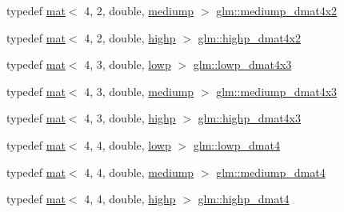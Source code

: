 \begin{DoxyCompactItemize}
typedef \mbox{\hyperlink{structglm_1_1mat}{mat}}$<$ 4, 2, double, \mbox{\hyperlink{namespaceglm_a36ed105b07c7746804d7fdc7cc90ff25a6416f3ea0c9025fb21ed50c4d6620482}{mediump}} $>$ \mbox{\hyperlink{group__core__precision_ga0ef199d025bd14f9fc8f3ebd2b8daaa5}{glm\+::mediump\+\_\+dmat4x2}}
\item 
typedef \mbox{\hyperlink{structglm_1_1mat}{mat}}$<$ 4, 2, double, \mbox{\hyperlink{namespaceglm_a36ed105b07c7746804d7fdc7cc90ff25ac6f7eab42eacbb10d59a58e95e362074}{highp}} $>$ \mbox{\hyperlink{group__core__precision_ga22c6b4fe5bb2e33a3cfa1c026803dd68}{glm\+::highp\+\_\+dmat4x2}}
\item 
typedef \mbox{\hyperlink{structglm_1_1mat}{mat}}$<$ 4, 3, double, \mbox{\hyperlink{namespaceglm_a36ed105b07c7746804d7fdc7cc90ff25ae161af3fc695e696ce3bf69f7332bc2d}{lowp}} $>$ \mbox{\hyperlink{group__core__precision_gaf829f4341a7592475df926eb9b416dd4}{glm\+::lowp\+\_\+dmat4x3}}
\item 
typedef \mbox{\hyperlink{structglm_1_1mat}{mat}}$<$ 4, 3, double, \mbox{\hyperlink{namespaceglm_a36ed105b07c7746804d7fdc7cc90ff25a6416f3ea0c9025fb21ed50c4d6620482}{mediump}} $>$ \mbox{\hyperlink{group__core__precision_ga3c31b359e06498f36aae9bfde929a8ce}{glm\+::mediump\+\_\+dmat4x3}}
\item 
typedef \mbox{\hyperlink{structglm_1_1mat}{mat}}$<$ 4, 3, double, \mbox{\hyperlink{namespaceglm_a36ed105b07c7746804d7fdc7cc90ff25ac6f7eab42eacbb10d59a58e95e362074}{highp}} $>$ \mbox{\hyperlink{group__core__precision_ga9a5dab260df6e8c46c747bac0b8d2f38}{glm\+::highp\+\_\+dmat4x3}}
\item 
typedef \mbox{\hyperlink{structglm_1_1mat}{mat}}$<$ 4, 4, double, \mbox{\hyperlink{namespaceglm_a36ed105b07c7746804d7fdc7cc90ff25ae161af3fc695e696ce3bf69f7332bc2d}{lowp}} $>$ \mbox{\hyperlink{group__core__precision_ga608895f4a515c7ac6cf3a1c2f11e13cc}{glm\+::lowp\+\_\+dmat4}}
\item 
typedef \mbox{\hyperlink{structglm_1_1mat}{mat}}$<$ 4, 4, double, \mbox{\hyperlink{namespaceglm_a36ed105b07c7746804d7fdc7cc90ff25a6416f3ea0c9025fb21ed50c4d6620482}{mediump}} $>$ \mbox{\hyperlink{group__core__precision_ga4b027f0f888d5ec1e77a00cb5517f56a}{glm\+::mediump\+\_\+dmat4}}
\item 
typedef \mbox{\hyperlink{structglm_1_1mat}{mat}}$<$ 4, 4, double, \mbox{\hyperlink{namespaceglm_a36ed105b07c7746804d7fdc7cc90ff25ac6f7eab42eacbb10d59a58e95e362074}{highp}} $>$ \mbox{\hyperlink{group__core__precision_ga878bb8f4881dbf688ab9bbb5e2944a54}{glm\+::highp\+\_\+dmat4}}
\item 

\end{DoxyCompactItemize}
